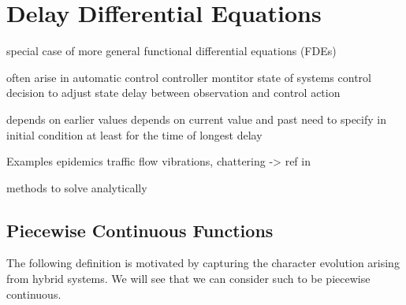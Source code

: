 \chapter{Delay Differential Equations}

special case of more general functional differential equations (FDEs)

often arise in automatic control
controller montitor state of systems
control decision to adjust state
delay between observation and control action

depends on earlier values
depends on current value and past
need to specify in initial condition
at least for the time of longest delay

Examples
epidemics
traffic flow
vibrations, chattering
-> ref in \cite{Falbo06FDEs}

methods to solve analytically \cite{Falbo06FDEs}

\section{Piecewise Continuous Functions}
    \label{sec:piecewise-continuous-functions}
    
    The following definition is motivated by capturing the character evolution arising from hybrid systems. We will see that we can consider such to be piecewise continuous.




